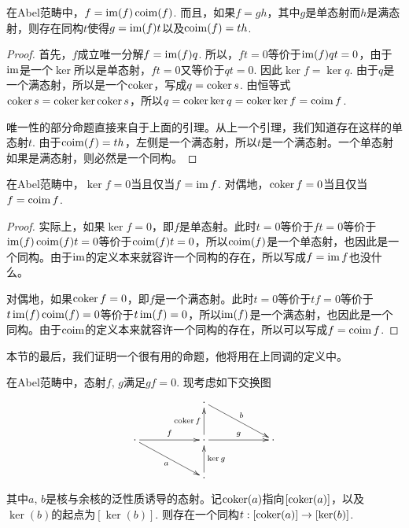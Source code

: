 \begin{pro}\label{uni}
在Abel范畴中，$f=\operatorname{im}(f)\operatorname{coim}(f)$. 而且，如果$f=gh$，其中$g$是单态射而$h$是满态射，则存在同构$t$使得$g=\operatorname{im}(f)t$以及$\operatorname{coim}(f)=th$.
\end{pro}

\begin{proof}
首先，$f$成立唯一分解$f=\operatorname{im}(f)q$. 所以，$ft=0$等价于$\operatorname{im}(f)qt=0$，由于$\operatorname{im}$是一个$\ker$所以是单态射，$ft=0$又等价于$qt=0$. 因此$\ker f= \ker q$. 由于$q$是一个满态射，所以是一个$\operatorname{coker}$，写成$q=\operatorname{coker} s$. 由恒等式$\operatorname{coker} s = \operatorname{coker} \ker \operatorname{coker} s$，所以$q=\operatorname{coker} \ker q=\operatorname{coker} \ker f=\operatorname{coim} f$. 

唯一性的部分命题直接来自于上面的引理。从上一个引理，我们知道存在这样的单态射$t$. 由于$\operatorname{coim}(f)=th$，左侧是一个满态射，所以$t$是一个满态射。一个单态射如果是满态射，则必然是一个同构。
\end{proof}

\begin{pro}
在Abel范畴中，$\ker f=0$当且仅当$f=\operatorname{im} f$. 对偶地，$\operatorname{coker} f=0$当且仅当$f=\operatorname{coim} f$. 
\end{pro}

\begin{proof}
实际上，如果$\ker f=0$，即$f$是单态射。此时$t=0$等价于$ft=0$等价于$\operatorname{im} (f) \operatorname{coim}(f)t=0$等价于$\operatorname{coim}(f)t=0$，所以$\operatorname{coim}(f)$是一个单态射，也因此是一个同构。由于$\operatorname{im}$的定义本来就容许一个同构的存在，所以写成$f=\operatorname{im} f$也没什么。

对偶地，如果$\operatorname{coker} f=0$，即$f$是一个满态射。此时$t=0$等价于$tf=0$等价于$t\operatorname{im} (f) \operatorname{coim}(f)=0$等价于$t\operatorname{im}(f)=0$，所以$\operatorname{im}(f)$是一个满态射，也因此是一个同构。由于$\operatorname{coim}$的定义本来就容许一个同构的存在，所以可以写成$f=\operatorname{coim} f$.
\end{proof}

本节的最后，我们证明一个很有用的命题，他将用在上同调的定义中。

\begin{pro}
在Abel范畴中，态射$f$, $g$满足$gf=0$. 现考虑如下交换图
\[
\begin{xy}
	\xymatrix{
	&&\cdot \ar[rrd]^b&&\\
	\cdot \ar[rr]^f \ar[rrd]_a&&\cdot \ar[rr]^g\ar[u]^{\coker f}&&\cdot\\
	&&\cdot \ar[u]_{\ker g}&&
	}
\end{xy}
\]
其中$a$, $b$是核与余核的泛性质诱导的态射。记$\operatorname{coker}(a)$指向$[\operatorname{coker}(a)]$，以及$\ker(b)$的起点为$[\ker(b)]$. 则存在一个同构$t:[\operatorname{coker}(a)]\to [\ker(b)]$.
\end{pro}

